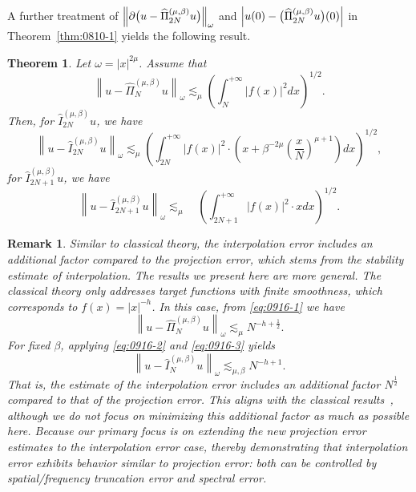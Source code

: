 \documentclass[pdflatex,sn-aps]{sn-jnl}%
\theoremstyle{thmstyleone}%
\newtheorem{theorem}{Theorem}[section]%
\theoremstyle{thmstyletwo}%
\newtheorem{remark}{Remark}%
\theoremstyle{thmstylethree}%
\begin{document}
A further treatment of $\Bigl\|\partial\bigl(u-\widehat{\Pi}_{2 N}^{(\mu, \beta)} u\bigr)\Bigr\|_{\omega}$
and $\Bigl|u(0)-\bigl(\widehat{\Pi}_{2 N}^{(\mu, \beta)} u\bigr)(0)\Bigr|$ in Theorem~\ref{thm:0810-1} yields the following result.
\begin{theorem}\label{thm:0916-1}
  Let $\omega = |x|^{2\mu}$. Assume that
  \begin{equation}\label{eq:0916-1}
    \left\|u-\widehat{\Pi}_N^{(\mu, \beta)} u\right\|_{\omega} \lesssim_\mu\left(\int_N^{+\infty} \left|f(x)\right|^2 d x\right)^{1 / 2}.
  \end{equation}
  Then, for $\widehat{I}_{2 N}^{(\mu, \beta)} u$, we have
  \begin{equation}\label{eq:0916-2}
    \left\|u-\widehat{I}_{2 N}^{(\mu, \beta)} u\right\|_\omega \lesssim_\mu\left(\int_{2 N}^{+\infty} \left|f(x)\right|^2 \cdot \left(x + \beta^{-2\mu}\left(\frac{x}{N}\right)^{\mu+1}\right) d x\right)^{1 / 2},
  \end{equation}
  for $\widehat{I}_{2 N+1}^{(\mu, \beta)} u$, we have
  \begin{equation}\label{eq:0916-3}
    \left\|u-\widehat{I}_{2 N+1}^{(\mu, \beta)} u\right\|_\omega \lesssim_\mu \quad\left(\int_{2 N+1}^{+\infty} \left|f(x)\right|^2 \cdot x d x\right)^{1 / 2}.
  \end{equation}
\end{theorem}

\begin{remark}
  Similar to classical theory, the interpolation error includes an additional factor compared to the projection error, which stems from the stability estimate of interpolation.
  The results we present here are more general. The classical theory only addresses target functions with finite smoothness, which corresponds to $f(x) = |x|^{-h}$.
  In this case, from \eqref{eq:0916-1} we have
  \begin{displaymath}
    \left\|u-\widehat{\Pi}_N^{(\mu, \beta)} u\right\|_{\omega} \lesssim_\mu N^{-h+\frac{1}{2}}.
  \end{displaymath}
  For fixed $\beta$, applying \eqref{eq:0916-2} and \eqref{eq:0916-3} yields
  \begin{displaymath}
    \left\|u-\widehat{I}_{N}^{(\mu, \beta)} u\right\|_\omega \lesssim_{\mu,\beta} N^{-h+1}.
  \end{displaymath}
  That is, the estimate of the interpolation error includes an additional factor 
  $N^{\frac{1}{2}}$ compared to that of the projection error.
  This aligns with the classical results~\cite{aguirre_hermite_2005}, although we do not focus on minimizing this additional factor as much as possible here.
  Because our primary focus is on extending the new projection error estimates to the interpolation error case, 
  thereby demonstrating that interpolation error exhibits behavior similar to projection error: both can be controlled by spatial/frequency truncation error and spectral error.
\end{remark}
\end{document}
